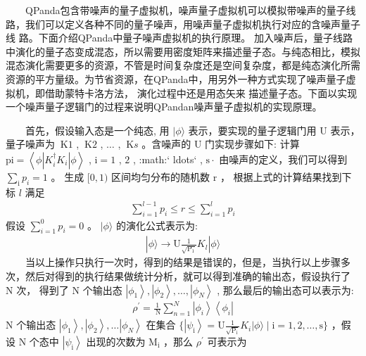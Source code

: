 \documentclass[a4paper,11pt,english]{sphinxmanual}
\begin{document}
\sphinxAtStartPar
  QPanda包含带噪声的量子虚拟机，噪声量子虚拟机可以模拟带噪声的量子线路，我们可以定义各种不同的量子噪声，用噪声量子虚拟机执行对应的含噪声量子线 路。下面介绍QPanda中量子噪声虚拟机的执行原理。 加入噪声后，量子线路中演化的量子态变成混态，所以需要用密度矩阵来描述量子态。与纯态相比，模拟混态演化需要更多的资源，不管是时间复杂度还是空间复杂度，都是纯态演化所需资源的平方量级。为节省资源，在QPanda中，用另外一种方式实现了噪声量子虚拟机，即借助蒙特卡洛方法， 演化过程中还是用态矢来 描述量子态。下面以实现一个噪声量子逻辑门的过程来说明QPandan噪声量子虚拟机的实现原理。

\sphinxAtStartPar
  首先，假设输入态是一个纯态, 用  \(|\phi\rangle\) 表示，要实现的量子逻辑门用  \(\mathrm{U}\) 表示，量子噪声为 \(\mathrm{~K}{1}\) ,  \(\mathrm{~K}{2}\) , \(\ldots\) , \(\mathrm{~K}{s}\) 。含噪声的  \(\mathrm{U}\) 门实现步骤如下: 计算 \(\mathrm{p}{\mathrm{i}}=\left\langle\phi\left|K_{i}^{\dagger} K_{i}\right| \phi\right\rangle\) , \(\mathrm{i}=1\) , \(2\) , :math:` ldots` , \(\mathrm{s} \cdot\) 由噪声的定义，我们可以得到  \(\sum_{\mathrm{i}} p_{i}=1\) 。 生成  \([0, 1)\) 区间均匀分布的随机数  \(\mathrm{r}\) ， 根据上式的计算结果找到下标  \(l\) 满足
\begin{equation*}
\begin{split}\sum_{i=1}^{l-1} p_{i} \leq r \leq \sum_{i=1}^{l} p_{i}\end{split}
\end{equation*}
\sphinxAtStartPar
假设 \(\sum_{i=1}^{0} p_{i}=0\) 。  \(|\phi\rangle\) 的演化公式表示为:
\begin{equation*}
\begin{split}|\phi\rangle \rightarrow \mathrm{U} \frac{1}{\sqrt{\mathrm{P}_{1}}} K_{l}|\phi\rangle\end{split}
\end{equation*}
\sphinxAtStartPar
  当以上操作只执行一次时，得到的结果是错误的，但是，当执行以上步骤多次，然后对得到的执行结果做统计分析，就可以得到准确的输出态，假设执行了 \(\mathrm{N}\) 次， 得到了  \(\mathrm{N}\) 个输出态 \(\left|\phi_{1}\right\rangle,\left|\phi_{2}\right\rangle, \ldots ,\left|\phi_{N}\right\rangle\) , 那么最后的输出态可以表示为:
\begin{equation*}
\begin{split}\rho^{\prime}=\frac{1}{\mathrm{~N}} \sum_{n=1}^{N}\left|\phi_{i}\right\rangle\left\langle\phi_{i}\right|\end{split}
\end{equation*}
\sphinxAtStartPar
\(\mathrm{N}\) 个输出态 \(\left|\phi_{1}\right\rangle,\left|\phi_{2}\right\rangle, \ldots\left|\phi_{N}\right\rangle\) 在集合 \(\{\left|\psi_{\mathrm{i}}\right\rangle=\mathrm{U} \frac{1}{\sqrt{\mathrm{P_i}}} K_{i}|\phi\rangle \mid \mathrm{i}=1,2, \ldots, \mathrm{s}\}\) ，假设 \(\mathrm{N}\) 个态中 \(\left|\psi_{\mathrm{i}}\right\rangle\) 出现的次数为 \(\mathrm{M}_{\mathrm{i}}\) ，那么 \(\rho^{\prime}\) 可表示为
\end{document}
